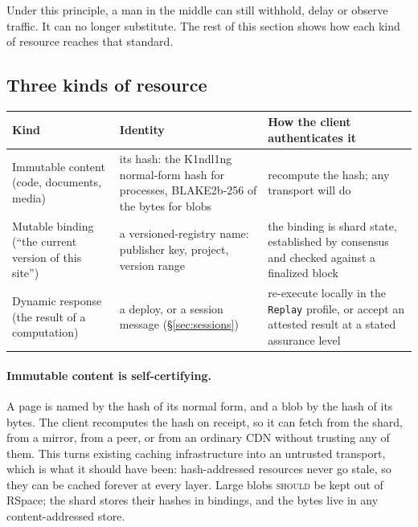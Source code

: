 \documentclass[11pt]{article}
\theoremstyle{definition}
\theoremstyle{remark}
\newcommand{\Kind}{K1ndl1ng}
\newcommand{\SHOULD}{\textsc{should}}
\newcommand{\code}[1]{\texttt{#1}}
\begin{document}
\noindent
Under this principle, a man in the middle can still withhold, delay or observe
traffic. It can no longer substitute. The rest of this section shows how each kind of
resource reaches that standard.

\subsection{Three kinds of resource}

\begin{center}
\begin{tabularx}{\linewidth}{@{}p{3.0cm}p{4.2cm}X@{}}
\toprule
Kind & Identity & How the client authenticates it\\
\midrule
Immutable content (code, documents, media) & its hash: the \Kind{} normal-form hash for processes, BLAKE2b-256 of the bytes for blobs & recompute the hash; any transport will do\\
Mutable binding (``the current version of this site'') & a versioned-registry name: publisher key, project, version range & the binding is shard state, established by consensus and checked against a finalized block\\
Dynamic response (the result of a computation) & a deploy, or a session message (\S\ref{sec:sessions}) & re-execute locally in the \code{Replay} profile, or accept an attested result at a stated assurance level\\
\bottomrule
\end{tabularx}
\end{center}

\paragraph{Immutable content is self-certifying.}
A page is named by the hash of its normal form, and a blob by the hash of its bytes.
The client recomputes the hash on receipt, so it can fetch from the shard, from a
mirror, from a peer, or from an ordinary CDN without trusting any of them. This turns
existing caching infrastructure into an untrusted transport, which is what it should
have been: hash-addressed resources never go stale, so they can be cached forever at
every layer. Large blobs \SHOULD{} be kept out of RSpace; the shard stores their hashes
in bindings, and the bytes live in any content-addressed store.
\end{document}
